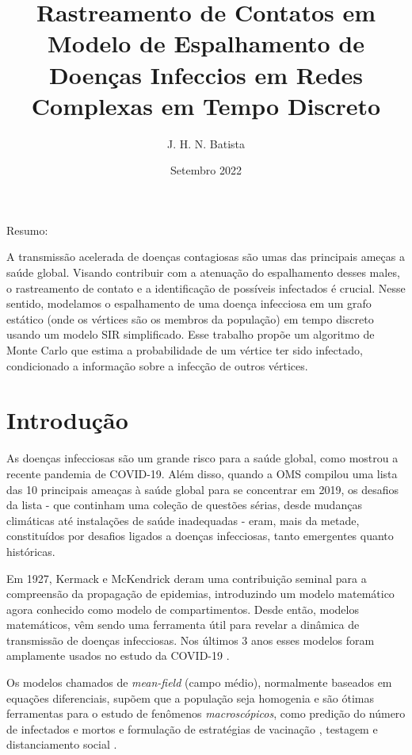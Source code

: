 \documentclass{article}
\title{Rastreamento de Contatos em Modelo de Espalhamento de Doenças Infeccios em Redes Complexas em Tempo Discreto}
\author{J. H. N. Batista}
\date{Setembro 2022}
\begin{document}
\maketitle

\begin{center}
    Resumo:
    
    A transmissão acelerada de doenças contagiosas são umas das principais ameças a saúde global. Visando contribuir com a atenuação do espalhamento desses males, o rastreamento de contato e a identificação de possíveis infectados é crucial. Nesse sentido, modelamos o espalhamento de uma doença infecciosa em um grafo estático (onde os vértices são os membros da população) em tempo discreto usando um modelo SIR simplificado. Esse trabalho propõe um algoritmo de Monte Carlo que estima a probabilidade de um vértice ter sido infectado, condicionado a informação sobre a infecção de outros vértices.
\end{center}

\section{Introdução}


As doenças infecciosas são um grande risco para a saúde global, como mostrou a recente pandemia de COVID-19. Além disso, quando a OMS compilou uma lista das 10 principais ameaças à saúde global para se concentrar em 2019, os desafios da lista - que continham uma coleção de questões sérias, desde mudanças climáticas até instalações de saúde inadequadas - eram, mais da metade, constituídos por desafios ligados a doenças infecciosas, tanto emergentes quanto históricas.

Em 1927, Kermack e McKendrick \cite{kermack1927} deram uma contribuição seminal para a compreensão da propagação de epidemias, introduzindo um modelo matemático agora conhecido como modelo de compartimentos. Desde então, modelos matemáticos, vêm sendo uma ferramenta útil para revelar a dinâmica de transmissão de doenças infecciosas. Nos últimos 3 anos esses modelos foram amplamente usados no estudo da COVID-19 \cite{massad, india, india2}. 

Os modelos chamados de \textit{mean-field} (campo médio), normalmente baseados em equações diferenciais, supõem que a população seja homogenia e são ótimas ferramentas para o estudo de fenômenos \textit{macroscópicos}, como predição do número de infectados e mortos \cite{india, india2} e formulação de estratégias de vacinação \cite{vacina}, testagem \cite{massad} e distanciamento social \cite{distancialmento}.
\end{document}
